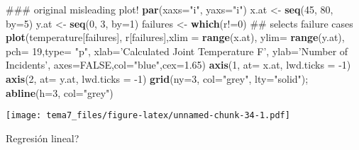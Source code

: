 \documentclass[]{article}
\newenvironment{Shaded}{\begin{snugshade}}{\end{snugshade}}
\newcommand{\KeywordTok}[1]{\textcolor[rgb]{0.13,0.29,0.53}{\textbf{{#1}}}}
\newcommand{\DataTypeTok}[1]{\textcolor[rgb]{0.13,0.29,0.53}{{#1}}}
\newcommand{\DecValTok}[1]{\textcolor[rgb]{0.00,0.00,0.81}{{#1}}}
\newcommand{\FloatTok}[1]{\textcolor[rgb]{0.00,0.00,0.81}{{#1}}}
\newcommand{\StringTok}[1]{\textcolor[rgb]{0.31,0.60,0.02}{{#1}}}
\newcommand{\OtherTok}[1]{\textcolor[rgb]{0.56,0.35,0.01}{{#1}}}
\newcommand{\NormalTok}[1]{{#1}}
\numberwithin{equation}{section}
\begin{document}
\begin{Shaded}
\begin{Highlighting}[]
\NormalTok{### original misleading plot!}
\KeywordTok{par}\NormalTok{(}\DataTypeTok{xaxs=}\StringTok{"i"}\NormalTok{, }\DataTypeTok{yaxs=}\StringTok{"i"}\NormalTok{)}
\NormalTok{x.at <-}\StringTok{ }\KeywordTok{seq}\NormalTok{(}\DecValTok{45}\NormalTok{, }\DecValTok{80}\NormalTok{, }\DataTypeTok{by=}\DecValTok{5}\NormalTok{)}
\NormalTok{y.at <-}\StringTok{ }\KeywordTok{seq}\NormalTok{(}\DecValTok{0}\NormalTok{, }\DecValTok{3}\NormalTok{, }\DataTypeTok{by=}\DecValTok{1}\NormalTok{)}
\NormalTok{failures <-}\StringTok{ }\KeywordTok{which}\NormalTok{(r!=}\DecValTok{0}\NormalTok{) ## selects failure cases}
\KeywordTok{plot}\NormalTok{(temperature[failures], r[failures],}\DataTypeTok{xlim =} \KeywordTok{range}\NormalTok{(x.at), }\DataTypeTok{ylim=} \KeywordTok{range}\NormalTok{(y.at),}
     \DataTypeTok{pch=} \DecValTok{19}\NormalTok{,}\DataTypeTok{type=} \StringTok{"p"}\NormalTok{, }\DataTypeTok{xlab=}\StringTok{'Calculated Joint Temperature F'}\NormalTok{,}
     \DataTypeTok{ylab=}\StringTok{'Number of Incidents'}\NormalTok{, }\DataTypeTok{axes=}\OtherTok{FALSE}\NormalTok{,}\DataTypeTok{col=}\StringTok{"blue"}\NormalTok{,}\DataTypeTok{cex=}\FloatTok{1.65}\NormalTok{)}
\KeywordTok{axis}\NormalTok{(}\DecValTok{1}\NormalTok{, }\DataTypeTok{at=} \NormalTok{x.at, }\DataTypeTok{lwd.ticks =} \NormalTok{-}\DecValTok{1}\NormalTok{)}
\KeywordTok{axis}\NormalTok{(}\DecValTok{2}\NormalTok{, }\DataTypeTok{at=} \NormalTok{y.at, }\DataTypeTok{lwd.ticks =} \NormalTok{-}\DecValTok{1}\NormalTok{)}
\KeywordTok{grid}\NormalTok{(}\DataTypeTok{ny=}\DecValTok{3}\NormalTok{, }\DataTypeTok{col=}\StringTok{"grey"}\NormalTok{, }\DataTypeTok{lty=}\StringTok{"solid"}\NormalTok{);}
\KeywordTok{abline}\NormalTok{(}\DataTypeTok{h=}\DecValTok{3}\NormalTok{, }\DataTypeTok{col=}\StringTok{"grey"}\NormalTok{)}
\end{Highlighting}
\end{Shaded}

\texttt{[image: tema7\_files/figure-latex/unnamed-chunk-34-1.pdf]}

Regresión lineal?
\end{document}
